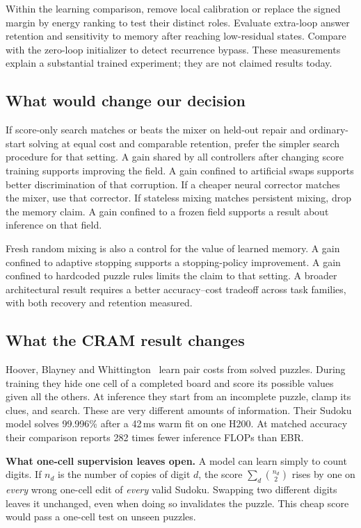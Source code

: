 \documentclass[11pt,a4paper]{article}
\newcommand{\newtopic}{\clearpage}
\begin{document}
Within the learning comparison, remove local calibration or replace the signed margin by energy ranking to test their distinct roles. Evaluate extra-loop answer retention and sensitivity to memory after reaching low-residual states. Compare with the zero-loop initializer to detect recurrence bypass. These measurements explain a substantial trained experiment; they are not claimed results today.

\subsection{What would change our decision}
If score-only search matches or beats the mixer on held-out repair and ordinary-start solving at equal cost and comparable retention, prefer the simpler search procedure for that setting. A gain shared by all controllers after changing score training supports improving the field. A gain confined to artificial swaps supports better discrimination of that corruption. If a cheaper neural corrector matches the mixer, use that corrector. If stateless mixing matches persistent mixing, drop the memory claim. A gain confined to a frozen field supports a result about inference on that field.

Fresh random mixing is also a control for the value of learned memory. A gain confined to adaptive stopping supports a stopping-policy improvement. A gain confined to hardcoded puzzle rules limits the claim to that setting. A broader architectural result requires a better accuracy--cost tradeoff across task families, with both recovery and retention measured.

\newtopic
\subsection{What the CRAM result changes}\label{sec:cram}
Hoover, Blayney and Whittington~\cite{cram} learn pair costs from solved puzzles. During training they hide one cell of a completed board and score its possible values given all the others. At inference they start from an incomplete puzzle, clamp its clues, and search. These are very different amounts of information. Their Sudoku model solves 99.996\% after a 42\,ms warm fit on one H200. At matched accuracy their comparison reports 282 times fewer inference FLOPs than EBR.

\textbf{What one-cell supervision leaves open.} A model can learn simply to count digits. If $n_d$ is the number of copies of digit $d$, the score $\sum_d\binom{n_d}{2}$ rises by one on \emph{every} wrong one-cell edit of \emph{every} valid Sudoku. Swapping two different digits leaves it unchanged, even when doing so invalidates the puzzle. This cheap score would pass a one-cell test on unseen puzzles.
\end{document}
